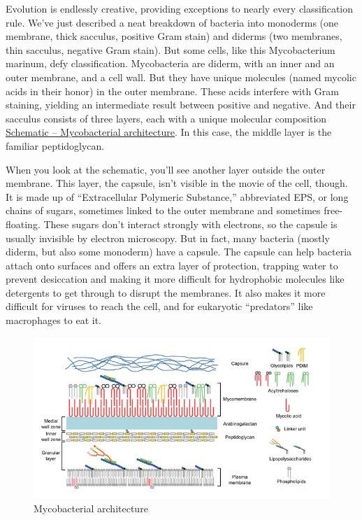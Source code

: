 \documentclass[]{tufte-book}
\begin{document}
Evolution is endlessly creative, providing exceptions to nearly every classification rule. We've just described a neat breakdown of bacteria into monoderms (one membrane, thick sacculus, positive Gram stain) and diderms (two membranes, thin sacculus, negative Gram stain). But some cells, like this Mycobacterium marinum, defy classification. Mycobacteria are diderm, with an inner and an outer membrane, and a cell wall. But they have unique molecules (named mycolic acids in their honor) in the outer membrane. These acids interfere with Gram staining, yielding an intermediate result between positive and negative. And their sacculus consists of three layers, each with a unique molecular composition \protect\hyperlink{fig:2-5-1}{Schematic -- Mycobacterial architecture}. In this case, the middle layer is the familiar peptidoglycan.

When you look at the schematic, you'll see another layer outside the outer membrane. This layer, the capsule, isn't visible in the movie of the cell, though. It is made up of ``Extracellular Polymeric Substance,'' abbreviated EPS, or long chains of sugars, sometimes linked to the outer membrane and sometimes free-floating. These sugars don't interact strongly with electrons, so the capsule is usually invisible by electron microscopy. But in fact, many bacteria (mostly diderm, but also some monoderm) have a capsule. The capsule can help bacteria attach onto surfaces and offers an extra layer of protection, trapping water to prevent desiccation and making it more difficult for hydrophobic molecules like detergents to get through to disrupt the membranes. It also makes it more difficult for viruses to reach the cell, and for eukaryotic ``predators'' like macrophages to eat it.

\hypertarget{htmlwidget-e3839cec5668b69b0540}{}

\begin{figure}
\includegraphics{img/02_schematic/2_5_1_Mycobacteria} \caption[Mycobacterial architecture]{Mycobacterial architecture}\label{fig:2-5-1}
\end{figure}
\end{document}
